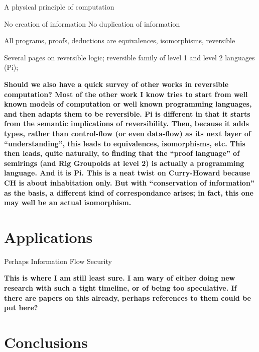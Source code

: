 \documentclass[12pt]{article}
\newcommand{\jc}[1]{\fbox{Jacques says:} \textbf{#1}}
\begin{document}
A physical principle of computation

No creation of information
No duplication of information

All programs, proofs, deductions are equivalences, isomorphisms,
reversible

Several pages on reversible logic; reversible family of level 1 and
level 2 languages (Pi);

\jc{Should we also have a quick survey of other works in reversible
computation? Most of the other work I know tries to start from 
well known models of computation or well known programming languages,
and then adapts them to be reversible. Pi is different in that it 
starts from the semantic implications of reversibility. Then, because
it adds types, rather than control-flow (or even data-flow) as its 
next layer of ``understanding'', this leads to equivalences, isomorphisms,
etc.  This then leads, quite naturally, to finding that the ``proof
language'' of semirings (and Rig Groupoids at level 2) is actually a 
programming language. And it is Pi. This is a neat twist on Curry-Howard
because CH is about \textbf{inhabitation} only. But with ``conservation
of information'' as the basis, a different kind of correspondance
arises; in fact, this one may well be an actual isomorphism.}

\section{Applications}

Perhaps Information Flow Security

\jc{This is where I am still least sure. I am wary of either doing
new research with such a tight timeline, or of being too speculative.
If there are papers on this already, perhaps references to them could
be put here?}

\section{Conclusions}

\end{document}
